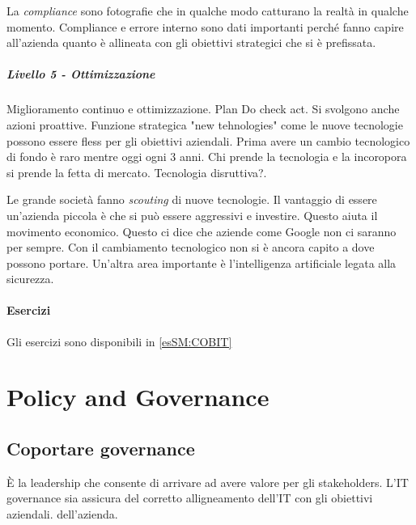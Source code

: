 

La \textit{compliance} sono fotografie che in qualche modo catturano la realtà 
in qualche momento. Compliance e errore interno sono dati importanti perché 
fanno capire all'azienda quanto è allineata con gli obiettivi strategici che si 
è prefissata.


\paragraph{Livello 5 - Ottimizzazione}

Miglioramento continuo e ottimizzazione. Plan Do check act.
Si svolgono anche azioni proattive. Funzione strategica "new tehnologies" come 
le nuove tecnologie possono essere fless per gli obiettivi aziendali. 
Prima avere un cambio tecnologico di fondo è raro mentre oggi ogni 3 anni. Chi 
prende la tecnologia e la incoropora si prende la fetta di mercato. Tecnologia 
disruttiva?.




Le grande società fanno \textit{scouting} di nuove tecnologie. Il vantaggio di 
essere un'azienda piccola è che si può essere aggressivi e investire. Questo 
aiuta il movimento economico. Questo ci dice che aziende come Google non ci 
saranno per sempre. Con il cambiamento tecnologico non si è ancora capito a dove 
possono portare. Un'altra area importante è l'intelligenza artificiale legata 
alla sicurezza.


\subsubsection{Esercizi}

Gli esercizi sono disponibili in \ref{esSM:COBIT}

\chapter{Policy and Governance}

\section{Coportare governance}

È la leadership che consente di arrivare ad avere valore per gli stakeholders.
L'IT governance sia assicura del corretto alligneamento dell'IT con gli 
obiettivi aziendali. dell'azienda.



